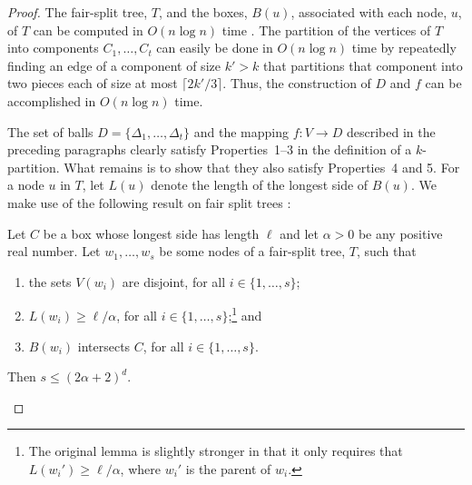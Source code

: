 \documentclass{patmorin}
\begin{document}
\begin{proof}
  The fair-split tree, $T$, and the boxes, $B(u)$, associated
  with each node, $u$, of $T$ can be computed in $O(n\log n)$ time
  \cite{callahan.kosaraju:decomposition}.  The partition of the vertices
  of $T$ into components $C_1,\ldots,C_t$ can easily be done in $O(n\log
  n)$ time by repeatedly finding an edge of a component of size $k'>k$
  that partitions that component into two pieces each of size at most
  $\lceil 2k'/3\rceil$.  Thus, the construction of $D$ and $f$ can be
  accomplished in $O(n\log n)$ time.

  The set of balls $D=\{\Delta_1,\ldots,\Delta_t\}$ and the mapping
  $f:V\to D$ described in the preceding paragraphs clearly satisfy
  Properties~1--3 in the definition of a $k$-partition.  What remains
  is to show that they also satisfy Properties~4 and 5. For a node
  $u$ in $T$, let $L(u)$ denote the length of the longest side of
  $B(u)$.  We make use of the following result on fair split trees
  \cite[Lemma~9.4.3]{narasimhan.smid:geometric}:

  \begin{lem}
     Let $C$ be a box whose longest side has length $\ell$ and let
     $\alpha >0$ be any positive real number.  Let $w_1,\ldots,w_s$
     be some nodes of a fair-split tree, $T$, such that
     \begin{enumerate}
       \item the sets $V(w_i)$ are disjoint, for all $i\in\{1,\ldots,s\}$;
       \item $L(w_i)\ge \ell/\alpha$, for all
          $i\in\{1,\ldots,s\}$;\footnote{The original lemma
          \cite[Lemma~9.4.3]{narasimhan.smid:geometric} is slightly
          stronger in that it only requires that $L(w_i')\ge \ell/\alpha$,
          where $w_i'$ is the parent of $w_i$.} and
       \item $B(w_i)$ intersects $C$, for all $i\in\{1,\ldots,s\}$.
     \end{enumerate}
     Then $s\le (2\alpha + 2)^d$.
  \end{lem}


\end{proof}
\end{document}
